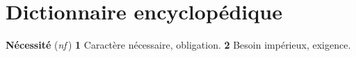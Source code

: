 
\section{Dictionnaire encyclopédique}
{\bf Nécessité} ({\it nf}\,) {\bf 1} Caractère nécessaire, obligation. {\bf 2} Besoin impérieux, exigence.
